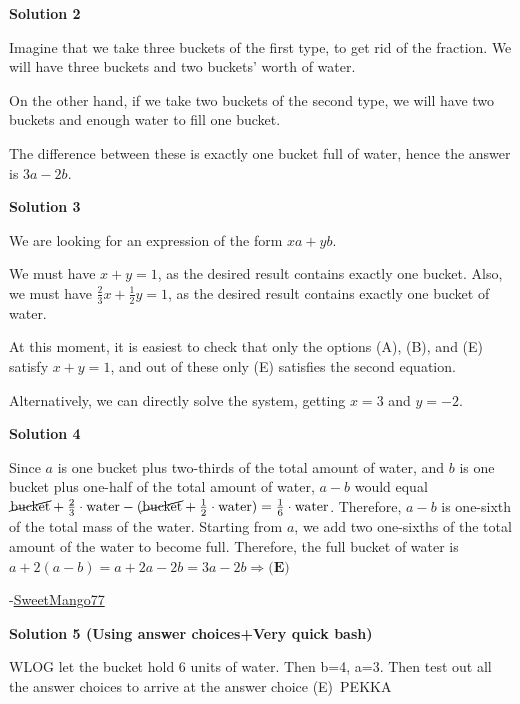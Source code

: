 \begin{enumerate}
 



\textbf{Solution 2}

Imagine that we take three buckets of the first type, to get rid of the fraction. We will have three buckets and two buckets' worth of water.

 On the other hand, if we take two buckets of the second type, we will have two buckets and enough water to fill one bucket.

 The difference between these is exactly one bucket full of water, hence the answer is $3a-2b$.

 



\textbf{Solution 3}

We are looking for an expression of the form $xa + yb$.

 We must have $x+y=1$, as the desired result contains exactly one bucket. Also, we must have $\frac 23 x + \frac 12 y = 1$, as the desired result contains exactly one bucket of water.

 At this moment, it is easiest to check that only the options (A), (B), and (E) satisfy $x+y=1$, and out of these only (E) satisfies the second equation.

 Alternatively, we can directly solve the system, getting $x=3$ and $y=-2$.

 



\textbf{Solution 4}

Since $a$ is one bucket plus two-thirds of the total amount of water, and $b$ is one bucket plus one-half of the total amount of water, $a-b$ would equal $\cancel{\text{bucket}}+\frac23\cdot\text{water}-(\cancel{\text{bucket}}+\frac12\cdot\text{water})=\frac16\cdot\text{water}$. Therefore, $a-b$ is one-sixth of the total mass of the water. Starting from $a$, we add two one-sixths of the total amount of the water to become full. Therefore, the full bucket of water is $a+2(a-b)=a+2a-2b=3a-2b\Rightarrow\textbf{(E)}$

 -\href{https://artofproblemsolving.com/wiki/index.php?title=User:Sweetmango77}{SweetMango77}

 



\textbf{Solution 5 (Using answer choices+Very quick bash)}

WLOG let the bucket hold 6 units of water. Then b=4, a=3. Then test out all the answer choices to arrive at the answer choice (E)~PEKKA


\end{enumerate}
